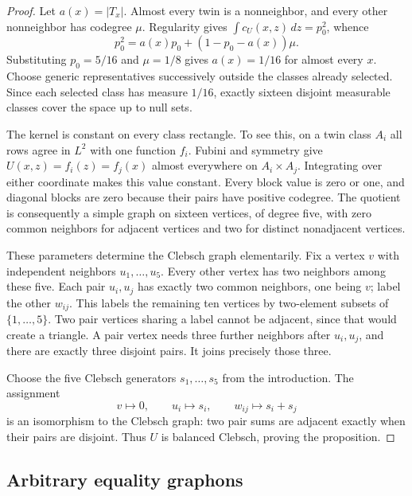 \documentclass[11pt]{amsart}
\theoremstyle{definition}
\theoremstyle{remark}
\begin{document}
\begin{proof}
Let $a(x)=|T_x|$. Almost every twin is a nonneighbor, and every other
nonneighbor has codegree $\mu$. Regularity gives
$\int c_U(x,z)\,dz=p_0^2$, whence
\[
 p_0^2=a(x)p_0+(1-p_0-a(x))\mu.
\]
Substituting $p_0=5/16$ and $\mu=1/8$ gives $a(x)=1/16$ for almost every
$x$. Choose generic representatives successively outside the classes already
selected. Since each selected class has measure $1/16$, exactly sixteen
disjoint measurable classes cover the space up to null sets.

The kernel is constant on every class rectangle. To see this, on a twin
class $A_i$ all rows agree in $L^2$ with one function $f_i$. Fubini and
symmetry give $U(x,z)=f_i(z)=f_j(x)$ almost everywhere on $A_i\times A_j$.
Integrating over either coordinate makes this value constant. Every block
value is zero or one, and diagonal blocks are zero because their pairs have
positive codegree. The quotient is consequently a simple graph on sixteen
vertices, of degree five, with zero common neighbors for adjacent vertices
and two for distinct nonadjacent vertices.

These parameters determine the Clebsch graph elementarily. Fix a vertex
$v$ with independent neighbors $u_1,\ldots,u_5$. Every other vertex has two
neighbors among these five. Each pair $u_i,u_j$ has exactly two common
neighbors, one being $v$; label the other $w_{ij}$. This labels the remaining
ten vertices by two-element subsets of $\{1,\ldots,5\}$. Two pair vertices
sharing a label cannot be adjacent, since that would create a triangle. A
pair vertex needs three further neighbors after $u_i,u_j$, and there are
exactly three disjoint pairs. It joins precisely those three.

Choose the five Clebsch generators $s_1,\ldots,s_5$ from the introduction.
The assignment
\[
 v\mapsto0,\qquad u_i\mapsto s_i,\qquad w_{ij}\mapsto s_i+s_j
\]
is an isomorphism to the Clebsch graph: two pair sums are adjacent exactly
when their pairs are disjoint. Thus $U$ is balanced Clebsch, proving the
proposition.
\end{proof}

\subsection{Arbitrary equality graphons}
\end{document}
